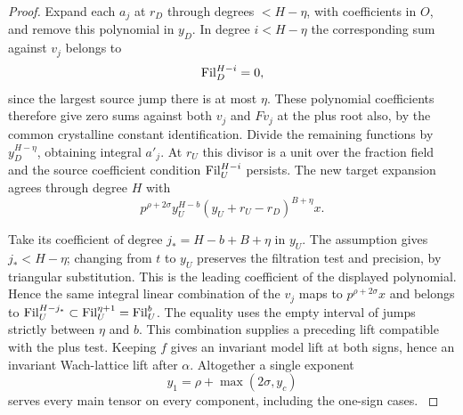 \begin{proof}
Expand each \(a_j\) at \(r_D\) through degrees \(<H-\eta\), with
coefficients in \(O\), and remove this polynomial in \(y_D\).
In degree \(i<H-\eta\) the corresponding sum against \(v_j\)
belongs to
\[
 {\rm Fil}^{H-i}_D=0,
\]
since the largest source
jump there is at most \(\eta\). These polynomial coefficients
therefore give zero sums against both \(v_j\) and \(Fv_j\) at the
plus root also, by the common crystalline constant identification.
Divide the remaining functions by \(y_D^{H-\eta}\), obtaining
integral \(a'_j\). At \(r_U\) this divisor is a unit over the
fraction field and the source coefficient condition
\({\rm Fil}^{H-i}_U\) persists. The new target expansion agrees
through degree \(H\) with
\[
       p^{\rho+2\sigma}y_U^{H-b}
                  (y_U+r_U-r_D)^{B+\eta}x .
\]

Take its coefficient of degree \(j_*=H-b+B+\eta\) in \(y_U\).
The assumption gives \(j_*<H-\eta\); changing from \(t\) to \(y_U\)
preserves the filtration test and precision, by triangular substitution.
This is the leading coefficient of the displayed polynomial. Hence
the same integral linear combination of the \(v_j\) maps to
\(p^{\rho+2\sigma}x\) and belongs to
\({\rm Fil}^{H-j_*}_U\subset{\rm Fil}^{\eta+1}_U
={\rm Fil}^b_U\). The equality uses the empty interval of jumps
strictly between \(\eta\) and \(b\). This combination supplies a
preceding lift compatible with the plus test. Keeping \(f\) gives
an invariant model lift at both signs, hence an invariant Wach-lattice
lift after \(\alpha\). Altogether a single exponent
\[
                       y_1=\rho+\max(2\sigma,y_c)
\]
serves every main tensor on every component, including the one-sign
cases.  \label{cor:row-mixed-1}
\end{proof}
